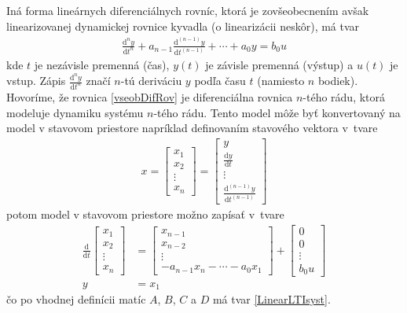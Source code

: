 \documentclass[a4paper, 10pt, ]{article}
\begin{document}
Iná forma lineárnych diferenciálnych rovníc, ktorá je zovšeobecnením avšak linearizovanej dynamickej rovnice kyvadla (o linearizácii neskôr), má tvar
\begin{align} \label{vseobDifRov}
	\frac{\text{d}^n y}{\text{d}t^n} + a_{n-1} \frac{\text{d}^{(n-1)} y}{\text{d}t^{(n-1)}} + \cdots + a_0 y = b_0 u
\end{align}
kde $t$ je nezávisle premenná (čas), $y(t)$ je závisle premenná (výstup) a $u(t)$ je vstup. Zápis $\frac{\text{d}^n y}{\text{d}t^n}$ značí $n$-tú deriváciu $y$ podľa času $t$ (namiesto $n$ bodiek). Hovoríme, že rovnica \eqref{vseobDifRov} je diferenciálna rovnica $n$-tého rádu, ktorá modeluje dynamiku systému $n$-tého rádu. Tento model môže byť konvertovaný na model v stavovom priestore napríklad definovaním stavového vektora v~tvare
\begin{align}
	x
	=
	\begin{bmatrix}
		x_1 \\ x_2 \\ \vdots \\ x_n
	\end{bmatrix}
	=
	\begin{bmatrix}
		y \\ \frac{\text{d}y}{\text{d}t} \\ \vdots \\ \frac{\text{d}^{(n-1)} y}{\text{d}t^{(n-1)}}
	\end{bmatrix}
\end{align}
potom model v stavovom priestore možno zapísať v~tvare
\begin{subequations}
\begin{align}
	\frac{\text{d}}{\text{d}t}
	\begin{bmatrix}
		x_1 \\ x_2 \\ \vdots \\ x_n
	\end{bmatrix}
	&=
	\begin{bmatrix}
		x_{n-1} \\ x_{n-2} \\ \vdots \\ -a_{n-1} x_n - \cdots - a_0 x_1
	\end{bmatrix}
	+
	\begin{bmatrix}
		0 \\ 0 \\ \vdots \\ b_0 u
	\end{bmatrix}
	\\
	y &= x_1
\end{align}
\end{subequations}
čo po vhodnej definícii matíc $A$, $B$, $C$ a $D$ má tvar \eqref{LinearLTIsyst}.
\end{document}

